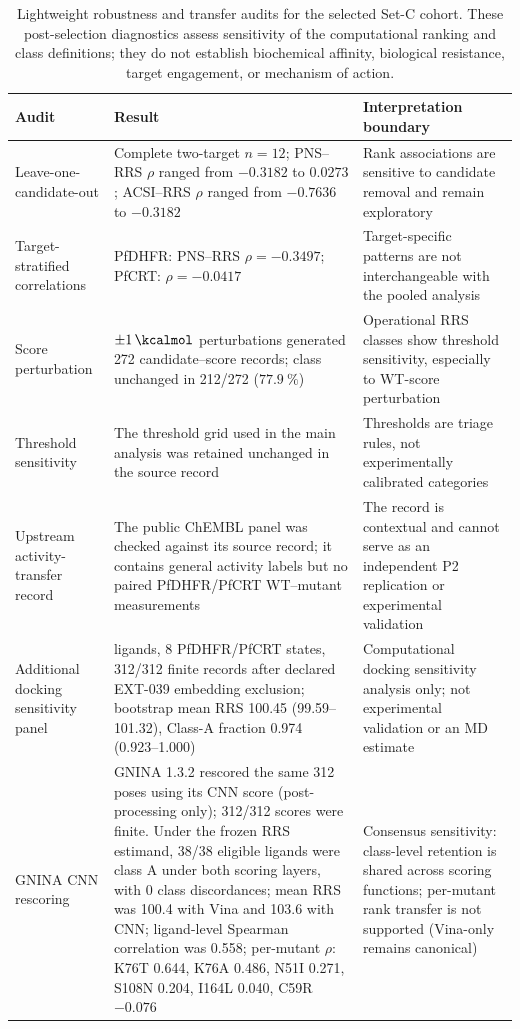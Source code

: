 \begin{table}[htbp]
\centering
\footnotesize
\caption{Lightweight robustness and transfer audits for the selected Set-C cohort. These post-selection diagnostics assess sensitivity of the computational ranking and class definitions; they do not establish biochemical affinity, biological resistance, target engagement, or mechanism of action.}
\label{tab:s15_robustness_transfer}
\begin{tabularx}{\textwidth}{@{}>{\raggedright\arraybackslash}p{} >{\raggedright\arraybackslash}p{} X@{}}
\toprule
Audit & Result & Interpretation boundary \\
\midrule
Leave-one-candidate-out & Complete two-target $n=12$; PNS--RRS $\rho$ ranged from $-0.3182$ to $0.0273$; ACSI--RRS $\rho$ ranged from $-0.7636$ to $-0.3182$ & Rank associations are sensitive to candidate removal and remain exploratory \\
Target-stratified correlations & PfDHFR: PNS--RRS $\rho=-0.3497$; PfCRT: $\rho=-0.0417$ & Target-specific patterns are not interchangeable with the pooled analysis \\
Score perturbation & $\pm\qty{1}{\kcalmol}$ perturbations generated 272 candidate--score records; class unchanged in 212/272 ($\qty{77.9}{\percent}$) & Operational RRS classes show threshold sensitivity, especially to WT-score perturbation \\
Threshold sensitivity & The threshold grid used in the main analysis was retained unchanged in the source record & Thresholds are triage rules, not experimentally calibrated categories \\
Upstream activity-transfer record & The public ChEMBL panel was checked against its source record; it contains general activity labels but no paired PfDHFR/PfCRT WT--mutant measurements & The record is contextual and cannot serve as an independent P2 replication or experimental validation \\
Additional docking sensitivity panel & 39 ligands, 8 PfDHFR/PfCRT states, 312/312 finite records after declared EXT-039 embedding exclusion; bootstrap mean RRS \num{100.45} (\numrange{99.59}{101.32}), Class-A fraction \num{0.974} (\numrange{0.923}{1.000}) & Computational docking sensitivity analysis only; not experimental validation or an MD estimate \\
GNINA CNN rescoring & GNINA 1.3.2 rescored the same 312 poses using its CNN score (post-processing only); 312/312 scores were finite. Under the frozen RRS estimand, 38/38 eligible ligands were class A under both scoring layers, with 0 class discordances; mean RRS was \num{100.4} with Vina and \num{103.6} with CNN; ligand-level Spearman correlation was \num{0.558}; per-mutant $\rho$: K76T \num{0.644}, K76A \num{0.486}, N51I \num{0.271}, S108N \num{0.204}, I164L \num{0.040}, C59R $-0.076$ & Consensus sensitivity: class-level retention is shared across scoring functions; per-mutant rank transfer is not supported (Vina-only remains canonical) \\

\end{tabularx}
\end{table}
